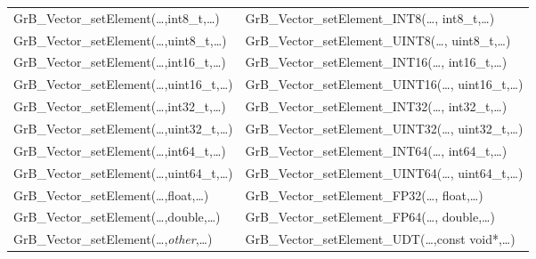 \begin{table}[htb]
{\begin{tabular}{l|l}
{\sf GrB\_Vector\_setElement(\ldots,int8\_t,\ldots)}		& {\sf GrB\_Vector\_setElement\_INT8(\ldots, int8\_t,\ldots)} \\
{\sf GrB\_Vector\_setElement(\ldots,uint8\_t,\ldots)}		& {\sf GrB\_Vector\_setElement\_UINT8(\ldots, uint8\_t,\ldots)} \\
{\sf GrB\_Vector\_setElement(\ldots,int16\_t,\ldots)}		& {\sf GrB\_Vector\_setElement\_INT16(\ldots, int16\_t,\ldots)} \\
{\sf GrB\_Vector\_setElement(\ldots,uint16\_t,\ldots)}		& {\sf GrB\_Vector\_setElement\_UINT16(\ldots, uint16\_t,\ldots)} \\
{\sf GrB\_Vector\_setElement(\ldots,int32\_t,\ldots)}		& {\sf GrB\_Vector\_setElement\_INT32(\ldots, int32\_t,\ldots)} \\
{\sf GrB\_Vector\_setElement(\ldots,uint32\_t,\ldots)}		& {\sf GrB\_Vector\_setElement\_UINT32(\ldots, uint32\_t,\ldots)} \\
{\sf GrB\_Vector\_setElement(\ldots,int64\_t,\ldots)}		& {\sf GrB\_Vector\_setElement\_INT64(\ldots, int64\_t,\ldots)} \\
{\sf GrB\_Vector\_setElement(\ldots,uint64\_t,\ldots)}		& {\sf GrB\_Vector\_setElement\_UINT64(\ldots, uint64\_t,\ldots)} \\
{\sf GrB\_Vector\_setElement(\ldots,float,\ldots)}		& {\sf GrB\_Vector\_setElement\_FP32(\ldots, float,\ldots)} \\
{\sf GrB\_Vector\_setElement(\ldots,double,\ldots)}		& {\sf GrB\_Vector\_setElement\_FP64(\ldots, double,\ldots)} \\
{\sf GrB\_Vector\_setElement(\ldots,\emph{other},\ldots)}	& {\sf GrB\_Vector\_setElement\_UDT(\ldots,const void*,\ldots)} \\ 


\end{tabular}}
\end{table}
